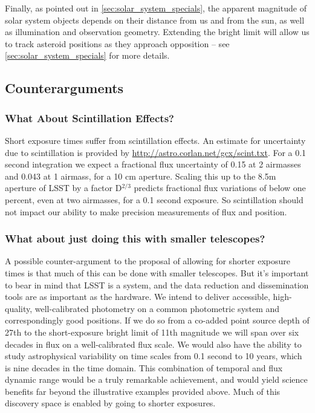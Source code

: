 Finally, as pointed out in \autoref{sec:solar_system_specials}, the apparent magnitude of solar system objects depends on their
distance from us and from the sun, as well as illumination and
observation geometry. Extending the bright limit will allow us to track
asteroid positions as they approach opposition -- see \autoref{sec:solar_system_specials} for more details.



\subsection{Counterarguments}
\label{sec:\secname:counter}


\subsubsection{What About Scintillation Effects?}

Short exposure times suffer from scintillation effects. An estimate for
uncertainty due to scintillation is provided by
\url{http://astro.corlan.net/gcx/scint.txt}. For a 0.1 second
integration we expect a fractional flux uncertainty of  0.15 at 2
airmasses and 0.043 at 1 airmass, for a 10 cm aperture. Scaling this up
to the 8.5m aperture of LSST by a factor D$^{2/3}$ predicts fractional
flux variations of below one percent, even at two airmasses, for a 0.1
second exposure. So scintillation should not impact our ability to make
precision measurements of flux and position.

\subsubsection{What about just doing this with smaller telescopes?}

A possible counter-argument to the proposal of allowing for shorter
exposure times is that much of this can be done with smaller telescopes.
But it's important to bear in mind that LSST is a system, and the data
reduction and dissemination tools are as important as the hardware. We
intend to deliver accessible, high-quality, well-calibrated photometry
on a common photometric system and correspondingly good positions. If we
do so from a co-added point source depth of 27th to the short-exposure
bright limit of 11th magnitude we will span over six decades in flux on
a well-calibrated flux scale. We would also have the ability to study
astrophysical variability on time scales from 0.1 second to 10 years,
which is nine decades in the time domain. This combination of temporal
and flux dynamic range would be a truly remarkable  achievement, and
would yield science benefits far beyond the illustrative examples
provided above. Much of this discovery space is enabled by going to
shorter exposures.

